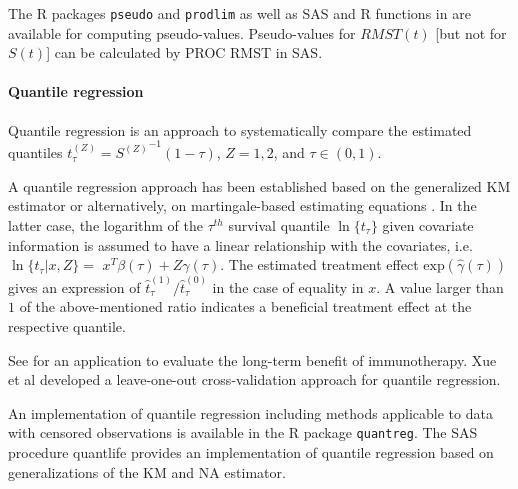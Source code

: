 \noindent 


\noindent The R packages \texttt{pseudo} and \texttt{prodlim} as well as SAS and R functions in \cite{Klein.2008} are available for computing pseudo-values. Pseudo-values for $RMST(t)$ [but not for $S(t)$] can be calculated by PROC RMST in SAS. 

\noindent 

\paragraph{Quantile regression} \label{quantile}

\noindent 


\noindent Quantile regression is an approach to systematically compare the estimated quantiles $t^{\left(Z\right)}_{\tau }={S^{\left({Z}\right)}}^{-1}\left(1-\tau \right)$, $Z=1,2$, and $\tau \in (0,1)$.

\noindent A quantile regression approach has been established based on the generalized KM estimator \cite{Portnoy.2003} or alternatively, on martingale-based estimating equations \cite{Peng.2008}. 
In the latter case, the logarithm of the ${\tau }^{th}$ survival quantile $\ln\{t_{\tau}\}$ given covariate information is assumed to have a linear relationship with the covariates, i.e. $\ln\{t_{\tau}|x,Z\}  =$ $x^T\beta (\tau )+Z\gamma (\tau )$. 
The estimated treatment effect ${\mathrm{exp} (\widehat{\gamma }(\tau ))\ }$ gives an expression of ${{\hat{t}}^{\left(1\right)}_{\tau }}/{{\hat{t}}^{\left(0\right)}_{\tau }}$ in the case of equality in $x$. A value larger than $1$ of the above-mentioned ratio indicates a beneficial treatment effect at the respective quantile. 

\noindent See \cite{Mboup.2021} for an application to evaluate the long-term benefit of immunotherapy. Xue et al \cite{Xue.2018} developed a leave-one-out cross-validation approach for quantile regression.


\noindent An implementation of quantile regression including methods applicable to data with censored observations is available in the R package \texttt{quantreg}. The SAS procedure quantlife provides an implementation of quantile regression based on generalizations of the KM and NA estimator. 

\noindent 


